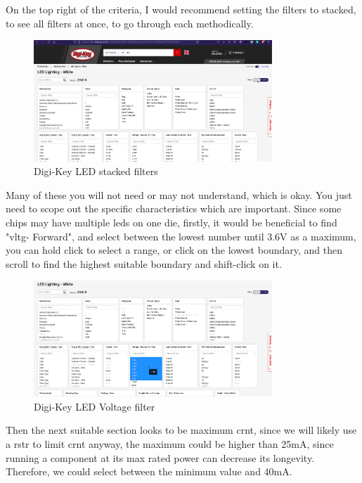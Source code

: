 \documentclass[a4paper,11pt]{report}
\begin{document}
On the top right of the criteria, I would recommend setting the filters to stacked, to see all filters at once, to go through each methodically.

\begin{figure}[H]
\centering
\includegraphics[width=0.8\textwidth]{screenshots/DigiKeyWhiteLEDPageStacked}
\caption{Digi-Key LED stacked filters}
\end{figure}

Many of these you will not need or may not understand, which is okay. You just need to scope out the specific characteristics which are important. Since some chips may have multiple \gls{led}s on one \gls{die}, firstly, it would be beneficial to find "\gls{vltg}- Forward", and select between the lowest number until 3.6V as a maximum, you can hold click to select a range, or click on the lowest boundary, and then scroll to find the highest suitable boundary and shift-click on it.

\begin{figure}[H]
\centering
\includegraphics[width=0.8\textwidth]{screenshots/DigiKeyWhiteLEDPageVoltage}
\caption{Digi-Key LED Voltage filter}
\end{figure}

Then the next suitable section looks to be maximum \gls{crnt}, since we will likely use a \gls{rstr} to limit \gls{crnt} anyway, the maximum could be higher than 25mA, since running a component at its max rated power can decrease its longevity. Therefore, we could select between the minimum value and 40mA.
\end{document}
